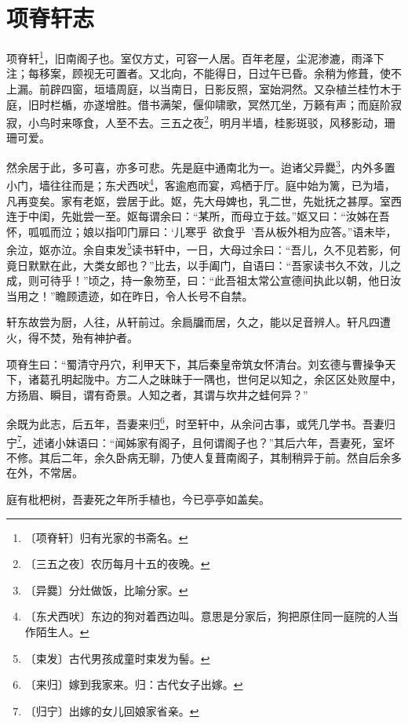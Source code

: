 \documentclass[12pt,UTF-8,openany,a4]{ctexbook}
\begin{document}
\chapter{项脊轩志}

\begin{large}
    
    项脊轩\footnote{〔项脊轩〕\yiwen 归有光家的书斋名。}，旧南阁子也。室仅方丈，可容一人居。百年老屋，尘泥渗漉，雨泽下注；每移案，顾视无可置者。又北向，不能得日，日过午已昏。余稍为修葺，使不上漏。前辟四窗，垣墙周庭，以当南日，日影反照，室始洞然。又杂植兰桂竹木于庭，旧时栏楯，亦遂增胜。借书满架，偃仰啸歌，冥然兀坐，万籁有声；而庭阶寂寂，小鸟时来啄食，人至不去。三五之夜\footnote{〔三五之夜〕\yiwen 农历每月十五的夜晚。}，明月半墙，桂影斑驳，风移影动，珊珊可爱。
    
    然余居于此，多可喜，亦多可悲。先是庭中通南北为一。迨诸父异爨\footnote{〔异爨〕\yiwen 分灶做饭，比喻分家。}，内外多置小门，墙往往而是；东犬西吠\footnote{〔东犬西吠〕\yiwen 东边的狗对着西边叫。意思是分家后，狗把原住同一庭院的人当作陌生人。}，客逾庖而宴，鸡栖于厅。庭中始为篱，已为墙，凡再变矣。家有老妪，尝居于此。妪，先大母婢也，乳二世，先妣抚之甚厚。室西连于中闺，先妣尝一至。妪每谓余曰：“某所，而母立于兹。”妪又曰：“汝姊在吾怀，呱呱而泣；娘以指叩门扉曰：‘儿寒乎~欲食乎~’吾从板外相为应答。”语未毕，余泣，妪亦泣。余自束发\footnote{〔束发〕\yiwen 古代男孩成童时束发为髻。}读书轩中，一日，大母过余曰：“吾儿，久不见若影，何竟日默默在此，大类女郎也？”比去，以手阖门，自语曰：“吾家读书久不效，儿之成，则可待乎！”顷之，持一象笏至，曰：“此吾祖太常公宣德间执此以朝，他日汝当用之！”瞻顾遗迹，如在昨日，令人长号不自禁。
    
    轩东故尝为厨，人往，从轩前过。余扃牖而居，久之，能以足音辨人。轩凡四遭火，得不焚，殆有神护者。
    
    项脊生曰：“蜀清守丹穴，利甲天下，其后秦皇帝筑女怀清台。刘玄德与曹操争天下，诸葛孔明起陇中。方二人之昧昧于一隅也，世何足以知之，余区区处败屋中，方扬眉、瞬目，谓有奇景。人知之者，其谓与坎井之蛙何异？”
    
    余既为此志，后五年，吾妻来归\footnote{〔来归〕\yiwen 嫁到我家来。归：古代女子出嫁。}，时至轩中，从余问古事，或凭几学书。吾妻归宁\footnote{〔归宁〕\yiwen 出嫁的女儿回娘家省亲。}，述诸小妹语曰：“闻姊家有阁子，且何谓阁子也？”其后六年，吾妻死，室坏不修。其后二年，余久卧病无聊，乃使人复葺南阁子，其制稍异于前。然自后余多在外，不常居。
    
    庭有枇杷树，吾妻死之年所手植也，今已亭亭如盖矣。
\end{large}
\end{document}
